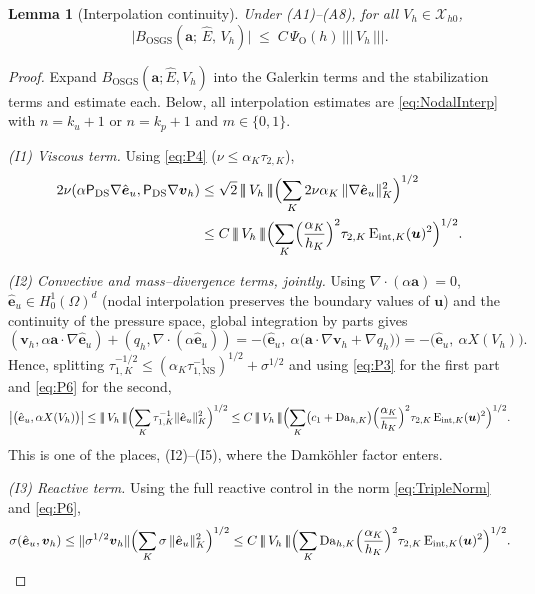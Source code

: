 \documentclass[11pt]{article}
\newtheorem{lemma}[theorem]{Lemma}
\theoremstyle{remark}
\newcommand{\bu}{\boldsymbol{u}}
\newcommand{\bv}{\boldsymbol{v}}
\newcommand{\ba}{\boldsymbol{a}}
\newcommand{\ViscProj}{\mathsf{P}_{\mathrm{DS}}}
\newcommand{\norm}[1]{\lVert #1 \rVert}
\newcommand{\tnorm}[1]{\lvert\!\lvert\!\lvert\, #1 \,\rvert\!\rvert\!\rvert}
\newcommand{\tns}{\tau_{1,\mathrm{NS}}}
\newcommand{\Eint}[2]{\mathrm{E}_{\mathrm{int},#1}(#2)}
\newcommand{\Dah}{\mathrm{Da}_{h,K}}
\newcommand{\Xhz}{\mathcal{X}_{h0}}
\begin{document}
\begin{lemma}[Interpolation continuity]
\label{lem:interpolation}
Under \textup{(A1)--(A8)}, for all $V_h \in \Xhz$,
\begin{equation}
  \label{eq:InterpolationBound}
  \bigl| B_{\mathrm{OSGS}}(\ba;\, \hat E,\, V_h) \bigr|
  \;\le\; C\,\Psi_{\mathrm O}(h)\,\tnorm{V_h}.
\end{equation}
\end{lemma}

\begin{proof}
Expand $B_{\mathrm{OSGS}}(\ba; \hat E, V_h)$ into the Galerkin terms and the
stabilization terms and estimate each. Below, all interpolation estimates are
\cref{eq:NodalInterp} with $n = k_u+1$ or $n = k_p+1$ and $m \in \{0,1\}$.

\smallskip\noindent
\emph{(I1) Viscous term.} Using \cref{eq:P4} ($\nu \le \alpha_K\tau_{2,K}$),
\begin{align*}
  2\nu(\alpha\ViscProj\nabla\hat{\boldsymbol e}_u, \ViscProj\nabla\bv_h)
  &\le \sqrt{2}\,\tnorm{V_h}\Bigl( \sum_K 2\nu\alpha_K\,
  \norm{\nabla\hat{\boldsymbol e}_u}_K^2 \Bigr)^{1/2}\\
  &\le C\,\tnorm{V_h}\Bigl( \sum_K
  \Bigl(\frac{\alpha_K}{h_K}\Bigr)^2\tau_{2,K}\,\Eint{K}{\bu}^2 \Bigr)^{1/2}.
\end{align*}

\smallskip\noindent
\emph{(I2) Convective and mass--divergence terms, jointly.} Using
$\nabla\cdot(\alpha\ba) = 0$, $\hat{\boldsymbol e}_u \in H^1_0(\Omega)^d$
(nodal interpolation preserves the boundary values of $\bu$) and the continuity of the
pressure space, global integration by parts gives
\[
  (\bv_h, \alpha\ba\cdot\nabla\hat{\boldsymbol e}_u)
  + (q_h, \nabla\cdot(\alpha\hat{\boldsymbol e}_u))
  = -\bigl( \hat{\boldsymbol e}_u,\ \alpha\bigl(\ba\cdot\nabla\bv_h + \nabla q_h\bigr)
  \bigr)
  = -\bigl( \hat{\boldsymbol e}_u,\ \alpha X(V_h) \bigr).
\]
Hence, splitting $\tau_{1,K}^{-1/2} \le (\alpha_K\tns^{-1})^{1/2} + \sigma^{1/2}$ and
using \cref{eq:P3} for the first part and \cref{eq:P6} for the second,
\[
  \bigl|\bigl(\hat{\boldsymbol e}_u, \alpha X(V_h)\bigr)\bigr|
  \le \tnorm{V_h} \Bigl( \sum_K \tau_{1,K}^{-1} \norm{\hat{\boldsymbol e}_u}_K^2
  \Bigr)^{1/2}
  \le C\,\tnorm{V_h}\Bigl( \sum_K \bigl(c_1 + \Dah\bigr)
  \Bigl(\frac{\alpha_K}{h_K}\Bigr)^2 \tau_{2,K}\,\Eint{K}{\bu}^2 \Bigr)^{1/2}.
\]
This is one of the places, (I2)--(I5), where the Damk\"ohler factor enters.

\smallskip\noindent
\emph{(I3) Reactive term.} Using the full reactive control in the norm
\cref{eq:TripleNorm} and \cref{eq:P6},
\[
  \sigma(\hat{\boldsymbol e}_u, \bv_h)
  \le \norm{\sigma^{1/2}\bv_h}\Bigl( \sum_K \sigma\,
  \norm{\hat{\boldsymbol e}_u}_K^2 \Bigr)^{1/2}
  \le C\,\tnorm{V_h}\Bigl( \sum_K \Dah
  \Bigl(\frac{\alpha_K}{h_K}\Bigr)^2\tau_{2,K}\,\Eint{K}{\bu}^2 \Bigr)^{1/2}.
\]


\end{proof}
\end{document}
